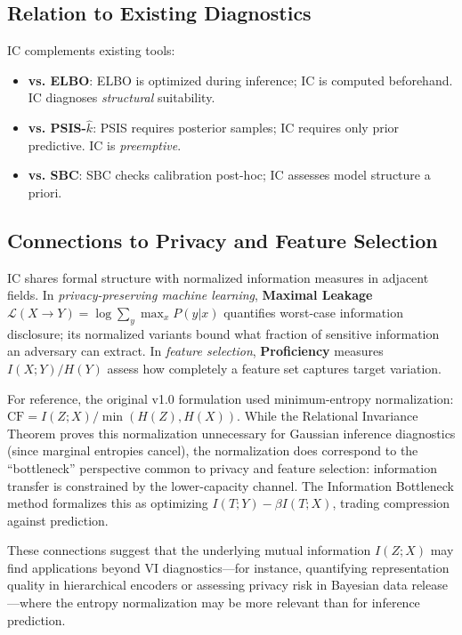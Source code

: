 \documentclass[10pt]{article} %
\theoremstyle{plain}
\theoremstyle{definition}
\begin{document}
\subsection{Relation to Existing Diagnostics}

IC complements existing tools:
\begin{itemize}
    \item \textbf{vs. ELBO}: ELBO is optimized during inference; IC is computed beforehand. IC diagnoses \emph{structural} suitability.
    \item \textbf{vs. PSIS-$\hat{k}$}: PSIS requires posterior samples; IC requires only prior predictive. IC is \emph{preemptive}.
    \item \textbf{vs. SBC}: SBC checks calibration post-hoc; IC assesses model structure a priori.
\end{itemize}

\subsection{Connections to Privacy and Feature Selection}

IC shares formal structure with normalized information measures in adjacent fields. In \emph{privacy-preserving machine learning}, \textbf{Maximal Leakage} $\mathcal{L}(X \to Y) = \log \sum_y \max_x P(y|x)$ quantifies worst-case information disclosure; its normalized variants bound what fraction of sensitive information an adversary can extract. In \emph{feature selection}, \textbf{Proficiency} measures $I(X;Y)/H(Y)$ assess how completely a feature set captures target variation.

For reference, the original v1.0 formulation used minimum-entropy normalization: $\text{CF} = I(Z;X)/\min(H(Z),H(X))$. While the Relational Invariance Theorem proves this normalization unnecessary for Gaussian inference diagnostics (since marginal entropies cancel), the normalization does correspond to the ``bottleneck'' perspective common to privacy and feature selection: information transfer is constrained by the lower-capacity channel. The Information Bottleneck method \citep{tishby1999information} formalizes this as optimizing $I(T;Y) - \beta I(T;X)$, trading compression against prediction.

These connections suggest that the underlying mutual information $I(Z;X)$ may find applications beyond VI diagnostics---for instance, quantifying representation quality in hierarchical encoders or assessing privacy risk in Bayesian data release---where the entropy normalization may be more relevant than for inference prediction.
\end{document}
